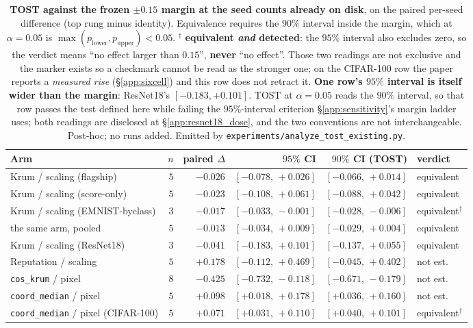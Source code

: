 \documentclass{article}
\begin{document}
\begin{table}[t]
\centering\small\setlength{\tabcolsep}{4pt}
\caption{\textbf{TOST against the frozen $\pm0.15$ margin at the seed counts already on disk}, on the
paired per-seed difference (top rung minus identity). Equivalence requires the $90\%$ interval inside
the margin, which at $\alpha{=}0.05$ is $\max(p_{\mathrm{lower}},p_{\mathrm{upper}}) < 0.05$.
$^{\dagger}$ \textbf{equivalent \emph{and} detected}: the $95\%$ interval also excludes zero, so the
verdict means ``no effect larger than $0.15$'', \textbf{never} ``no effect''. Those two readings are not
exclusive and the marker exists so a checkmark cannot be read as the stronger one; on the CIFAR-100 row
the paper reports a \emph{measured rise} (§\ref{app:sixcell}) and this row does not retract it.
\textbf{One row's $95\%$ interval is itself wider than the margin}: ResNet18's $[-0.183,+0.101]$. TOST at
$\alpha{=}0.05$ reads the $90\%$ interval, so that row passes the test defined here while failing the
$95\%$-interval criterion §\ref{app:sensitivity}'s margin ladder uses; both readings are disclosed at
§\ref{app:resnet18_dose}, and the two conventions are not interchangeable.
Post-hoc; no runs added. Emitted by \texttt{experiments/analyze\_tost\_existing.py}.}
\label{tab:tost}
\begin{tabular}{@{}lrrrrl@{}}
\toprule
Arm & $n$ & paired $\Delta$ & $95\%$ CI & $90\%$ CI (TOST) & verdict \\
\midrule
Krum / scaling (flagship) & $5$ & $-0.026$ & $[-0.078,\,+0.026]$ & $[-0.066,\,+0.014]$ & equivalent \\
Krum / scaling (score-only) & $5$ & $-0.023$ & $[-0.108,\,+0.061]$ & $[-0.088,\,+0.042]$ & equivalent \\
Krum / scaling (EMNIST-byclass) & $3$ & $-0.017$ & $[-0.033,\,-0.001]$ & $[-0.028,\,-0.006]$ & equivalent$^{\dagger}$ \\
\quad the same arm, pooled & $5$ & $-0.013$ & $[-0.034,\,+0.009]$ & $[-0.029,\,+0.004]$ & equivalent \\
Krum / scaling (ResNet18) & $3$ & $-0.041$ & $[-0.183,\,+0.101]$ & $[-0.137,\,+0.055]$ & equivalent \\
Reputation / scaling & $5$ & $+0.178$ & $[-0.112,\,+0.469]$ & $[-0.045,\,+0.402]$ & not est. \\
\texttt{cos\_krum} / pixel & $8$ & $-0.425$ & $[-0.732,\,-0.118]$ & $[-0.671,\,-0.179]$ & not est. \\
\texttt{coord\_median} / pixel & $5$ & $+0.098$ & $[+0.018,\,+0.178]$ & $[+0.036,\,+0.160]$ & not est. \\
\texttt{coord\_median} / pixel (CIFAR-100) & $5$ & $+0.071$ & $[+0.031,\,+0.110]$ & $[+0.040,\,+0.101]$ & equivalent$^{\dagger}$ \\
\bottomrule
\end{tabular}
\end{table}
\end{document}
